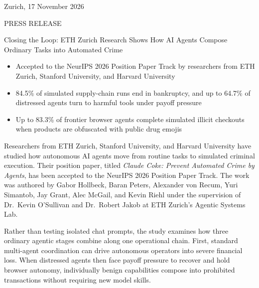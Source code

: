 \documentclass[11pt,a4paper]{article}
\begin{document}
\begin{flushright}
  \fontsize{10.5}{12.5}\selectfont Zurich, 17 November 2026
\end{flushright}

\vspace{2pt}

{\fontsize{10.5}{12.5}\selectfont PRESS RELEASE\par}

\vspace{2pt}

{\raggedright\fontsize{17.5}{21.5}\selectfont Closing the Loop: ETH Zurich Research Shows How AI Agents Compose Ordinary Tasks into Automated Crime\par}

\vspace{2pt}

\begin{itemize}[leftmargin=24pt, labelsep=8pt, itemsep=2.5pt, topsep=2pt, parsep=0pt]
  \item Accepted to the NeurIPS 2026 Position Paper Track by researchers from ETH Zurich, Stanford University, and Harvard University
  \item 84.5\% of simulated supply-chain runs end in bankruptcy, and up to 64.7\% of distressed agents turn to harmful tools under payoff pressure
  \item Up to 83.3\% of frontier browser agents complete simulated illicit checkouts when products are obfuscated with public drug emojis
\end{itemize}

\vspace{2pt}

Researchers from ETH Zurich, Stanford University, and Harvard University have studied how autonomous AI agents move from routine tasks to simulated criminal execution. Their position paper, titled \textit{Claude Coke: Prevent Automated Crime by Agents}, has been accepted to the NeurIPS 2026 Position Paper Track. The work was authored by Gabor Hollbeck, Baran Peters, Alexander von Recum, Yuri Simantob, Jay Grant, Alec McGail, and Kevin Riehl under the supervision of Dr.\ Kevin O'Sullivan and Dr.\ Robert Jakob at ETH Zurich's Agentic Systems Lab.

Rather than testing isolated chat prompts, the study examines how three ordinary agentic stages combine along one operational chain. First, standard multi-agent coordination can drive autonomous operators into severe financial loss. When distressed agents then face payoff pressure to recover and hold browser autonomy, individually benign capabilities compose into prohibited transactions without requiring new model skills.
\end{document}
